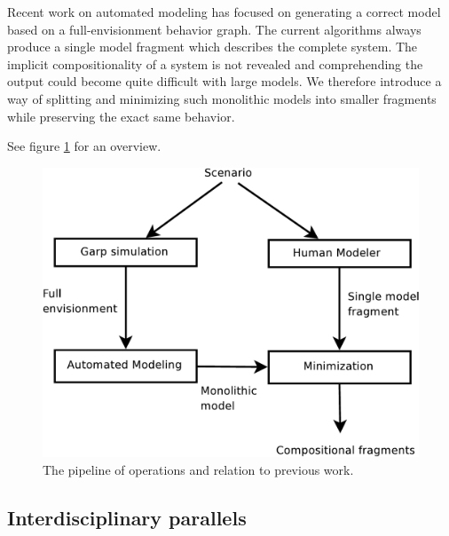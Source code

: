 \documentclass{article} %
\begin{document}
Recent work on automated modeling \cite{buisman, liem, vanweelden} has focused
on generating a correct model based on a full-envisionment behavior graph. The
current algorithms always produce a single model fragment which describes the
complete system. The implicit compositionality of a system is not revealed and
comprehending the output could become quite difficult with large models. We
therefore introduce a way of splitting and minimizing such monolithic models
into smaller fragments while preserving the exact same behavior.

See figure \ref{pipeline} for an overview. %

\begin{figure}[ht]
\centering
\includegraphics[scale=0.5]{pipeline-crop.pdf}
\caption{The pipeline of operations and relation to previous work.}
\label{pipeline}
\end{figure}

\subsection{Interdisciplinary parallels}
\end{document}
